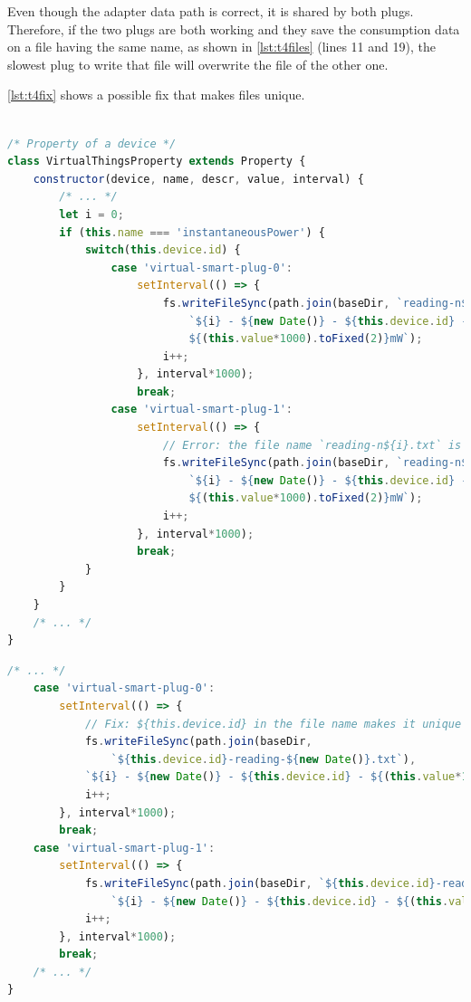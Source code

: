 Even though the adapter data path is correct, it is shared by both plugs. Therefore, if the two plugs are both working and they save the consumption data on a file having the same name, as shown in \autoref{lst:t4files} (lines 11 and 19), the slowest plug to write that file will overwrite the file of the other one.

\autoref{lst:t4fix} shows a possible fix that makes files unique.

\begin{lstlisting}[language=JavaScript, label=lst:t4files, caption=T4 - \texttt{smart-plugs-adapter} files conflict]

/* Property of a device */
class VirtualThingsProperty extends Property {
    constructor(device, name, descr, value, interval) {
        /* ... */
        let i = 0;
        if (this.name === 'instantaneousPower') {
            switch(this.device.id) {
                case 'virtual-smart-plug-0':
                    setInterval(() => {
                        fs.writeFileSync(path.join(baseDir, `reading-n${i}.txt`),
                            `${i} - ${new Date()} - ${this.device.id} - 
                            ${(this.value*1000).toFixed(2)}mW`);
                        i++;
                    }, interval*1000);
                    break;
                case 'virtual-smart-plug-1':
                    setInterval(() => {
                        // Error: the file name `reading-n${i}.txt` is the same as in the previous `case`!
                        fs.writeFileSync(path.join(baseDir, `reading-n${i}.txt`),
                            `${i} - ${new Date()} - ${this.device.id} - 
                            ${(this.value*1000).toFixed(2)}mW`);
                        i++;
                    }, interval*1000);
                    break;
            }
        }
    }
    /* ... */
}
\end{lstlisting}

\begin{lstlisting}[language=JavaScript, label=lst:t4fix, caption=T4 - \texttt{smart-plugs-adapter} fixing file names]
/* ... */
    case 'virtual-smart-plug-0':
        setInterval(() => {
            // Fix: ${this.device.id} in the file name makes it unique for each plug
            fs.writeFileSync(path.join(baseDir, 
                `${this.device.id}-reading-${new Date()}.txt`),
            `${i} - ${new Date()} - ${this.device.id} - ${(this.value*1000).toFixed(2)}mW`);
            i++;
        }, interval*1000);
        break;
    case 'virtual-smart-plug-1':
        setInterval(() => {
            fs.writeFileSync(path.join(baseDir, `${this.device.id}-reading-${new Date()}.txt`),
                `${i} - ${new Date()} - ${this.device.id} - ${(this.value*1000).toFixed(2)}mW`);
            i++;
        }, interval*1000);
        break;
    /* ... */
}
\end{lstlisting}


